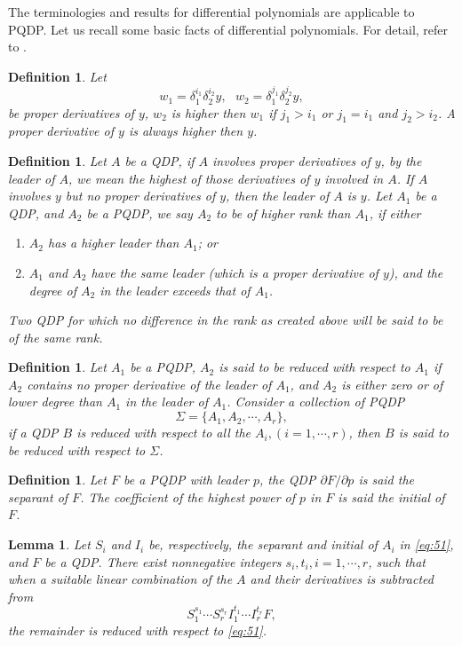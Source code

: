 \documentclass[preprint, 12pt]{elsarticle}
\newtheorem{lem}[thm]{Lemma}
\newtheorem{defn}[thm]{Definition}
\numberwithin{equation}{section}
\begin{document}
The terminologies and results for 
differential polynomials are applicable to PQDP. Let us
recall some basic facts of differential polynomials.  For
detail, refer to \cite{Ritt:50}.

\begin{defn}
\label{def:8}Let
$$w_1 = \delta_1^{i_1}\delta_2^{i_2} y,\ \ \ w_2 = \delta_1^{j_1}\delta_2^{j_2}y,$$
be proper derivatives of $y$, $w_2$ is \textit{higher} then $w_1$ if $j_1
> i_1$ or $j_1 = i_1$ and $j_2 > i_2$. A proper derivative of $y$
is always higher then $y$.
\end{defn}
\begin{defn}
\label{def:9}Let $A$ be a QDP, if $A$ involves proper
derivatives of $y$, by the \textit{leader} of $A$, we mean the
highest of those derivatives of $y$ involved in $A$. If
$A$ involves $y$ but no proper derivatives of $y$, then the leader
of $A$ is $y$. Let $A_1$ be a QDP, and $A_2$ be a PQDP, we
say $A_2$ to be of \textit{higher rank} than $A_1$, if either
\begin{enumerate}
    \item $A_2$ has a higher leader than $A_1$; or
    \item $A_1$ and $A_2$ have the same leader (which is a proper derivative of $y$),
    and the degree of $A_2$ in the leader exceeds that of $A_1$.
\end{enumerate}
Two QDP for which no difference in the rank as created above
will be said to be of the same rank.
\end{defn}
\begin{defn}
\label{def:10} Let $A_1$ be a PQDP, $A_2$ is said to be
\textit{reduced with respect to} $A_1$ if $A_2$ contains no proper
derivative of the leader of $A_1$, and $A_2$ is either zero or of
lower degree than $A_1$ in the leader of $A_1$. Consider a
collection of PQDP
\begin{equation}
\label{eq:51}\Sigma = \{A_1, A_2,\cdots,A_r\},
\end{equation}
if a QDP $B$ is reduced with respect to all the $A_i, (i=
1,\cdots, r)$, then $B$ is said to be reduced with respect to
$\Sigma$.
\end{defn}
\begin{defn}
\label{def:11} Let $F$ be a PQDP with leader $p$, the
QDP $\partial F/\partial p$ is
said the \textit{separant} of $F$. The coefficient of the highest
power of $p$ in $F$ is said the \textit{initial} of $F$.
\end{defn}


\begin{lem}
\label{le:27}\cite[pp.6]{Ritt:50} Let $S_i$ and $I_i$ be, respectively, the separant and initial of
$A_i$ in \eqref{eq:51}, and $F$ be a QDP. There
exist nonnegative integers $s_i,t_i, i= 1,\cdots,r$, such that
when a suitable linear combination of the $A$ and their
derivatives is subtracted from
$$S_1^{s_1}\cdots S_r^{s_r}I_1^{t_1}\cdots I_r^{t_r} F,$$
the remainder is reduced with respect to \eqref{eq:51}.
\end{lem}
\end{document}
